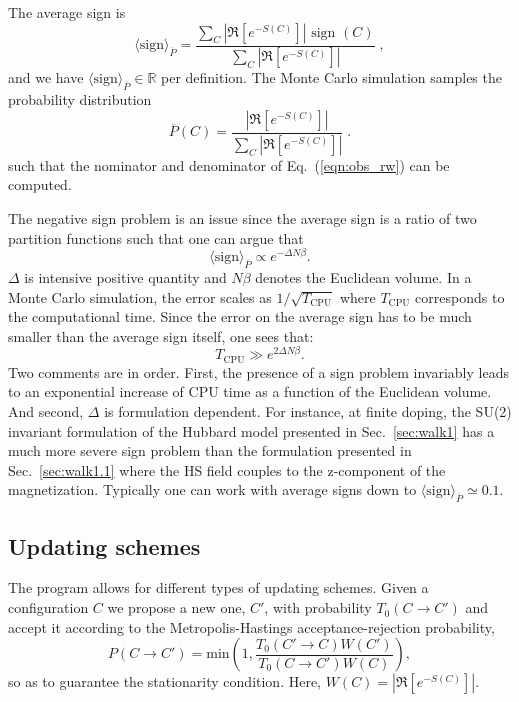 \documentclass{SciPost}
\begin{document}
The average sign is 
\begin{equation}\label{eqn:sign_rw}
	 \langle \text{sign} \rangle_{\overline{P}} =    \frac { \sum_{C}  \left|  \Re \left[ e^{-S(C)} \right]   \right|   \text{ sign }(C) }  {  \sum_{C}   \left| \Re \left[ e^{-S(C)} \right] \right|  } \;,
\end{equation}
and we have  $\langle \text{sign} \rangle_{\overline{P}} \in \mathbb{R}$ per definition.
The Monte Carlo simulation samples the probability distribution 
\begin{equation}  
	 \overline{P}(C) = \frac{ \left|  \Re \left[ e^{-S(C)} \right] \right| }{\sum_C \left|  \Re \left[ e^{-S(C)} \right]  \right| }\;.
\end{equation}
such that the nominator and denominator of  Eq.~(\ref{eqn:obs_rw})  can be computed.   

The negative sign problem is an issue since the average sign is a ratio of two partition functions such that one can argue that 
\begin{equation}
 \langle \text{sign} \rangle_{\overline{P}}   \propto e^{-  \Delta N \beta}.
\end{equation}
$\Delta $ is intensive positive quantity and $N \beta$ denotes the  Euclidean volume.    In a Monte Carlo simulation, the  error scales as $ 1/\sqrt{T_{\text{CPU}}} $   where $T_{\text{CPU}}$ corresponds to the computational  time.  Since the error on the  average sign has to be much smaller than the average sign itself,   one sees that:
\begin{equation}
	T_{\text{CPU}}  \gg e^{2 \Delta N \beta}.
\end{equation}   
Two comments are in order. First, the presence of a sign problem invariably leads to an exponential increase of CPU time as a function of the Euclidean volume. And second,  $\Delta$ is formulation dependent.  
For instance, at finite doping, the SU(2) invariant formulation of the Hubbard model presented in Sec.~\ref{sec:walk1}   has a much more severe sign problem than the formulation presented in Sec.~\ref{sec:walk1.1} where the HS field couples to the z-component of the magnetization.  Typically one can work with average signs  down to $ \langle \text{sign} \rangle_{\overline{P}} \simeq 0.1 $.

%
\subsection{Updating schemes}\label{sec:updating}
%
The program allows for different types of updating schemes.    Given a configuration $C$ we propose a new one, $C'$, with probability $T_0(C \rightarrow C')$  and accept it according to   the  Metropolis-Hastings   acceptance-rejection probability, 
\begin{equation}
	P(C \rightarrow C') =  \text{min}  \left( 1, \frac{T_0(C' \rightarrow C) W(C')}{T_0(C \rightarrow C') W(C)} \right),
\end{equation}
so as to guarantee the stationarity condition.  Here, $ W(C) = \left| \Re \left[ e^{-S(C)} \right] \right|   $.
\end{document}
